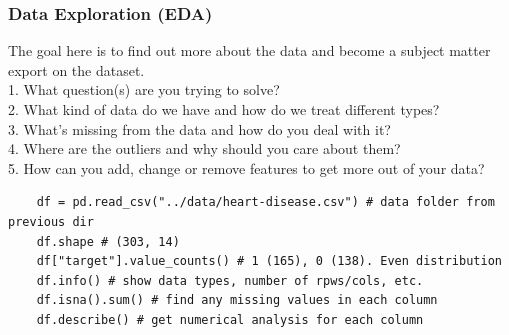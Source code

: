 \documentclass[11pt, a4paper]{article}
\begin{document}
\begin{spacing}{1.1}
	\subsubsection{Data Exploration (EDA)}
	The goal here is to find out more about the data and become a subject matter export on the dataset. \\
	1. What question(s) are you trying to solve? \\
	2. What kind of data do we have and how do we treat different types? \\
	3. What's missing from the data and how do you deal with it? \\
	4. Where are the outliers and why should you care about them? \\
	5. How can you add, change or remove features to get more out of your data?
	\begin{lstlisting}
	df = pd.read_csv("../data/heart-disease.csv") # data folder from previous dir
	df.shape # (303, 14)
	df["target"].value_counts() # 1 (165), 0 (138). Even distribution
	df.info() # show data types, number of rpws/cols, etc.
	df.isna().sum() # find any missing values in each column
	df.describe() # get numerical analysis for each column	
	

\end{lstlisting}
\end{spacing}
\end{document}
